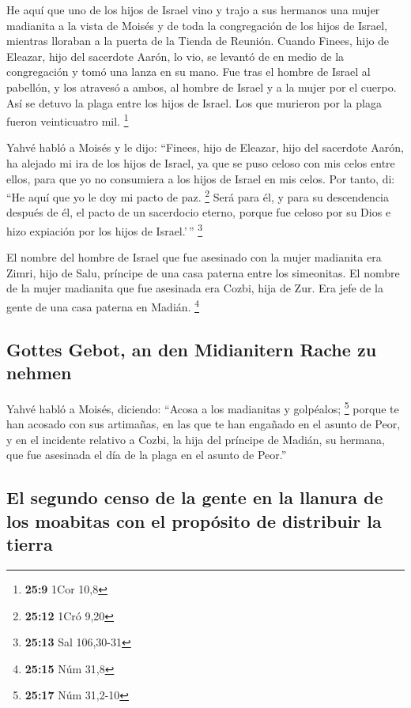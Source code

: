  He aquí que uno de los hijos de Israel vino y trajo a sus
hermanos una mujer madianita a la vista de Moisés y de toda la
congregación de los hijos de Israel, mientras lloraban a la puerta de la
Tienda de Reunión.  Cuando Finees, hijo de Eleazar, hijo
del sacerdote Aarón, lo vio, se levantó de en medio de la congregación y
tomó una lanza en su mano.  Fue tras el hombre de Israel
al pabellón, y los atravesó a ambos, al hombre de Israel y a la mujer
por el cuerpo. Así se detuvo la plaga entre los hijos de Israel.
 Los que murieron por la plaga fueron veinticuatro mil.
\footnote{\textbf{25:9} 1Cor 10,8}

 Yahvé habló a Moisés y le dijo: 
``Finees, hijo de Eleazar, hijo del sacerdote Aarón, ha alejado mi ira
de los hijos de Israel, ya que se puso celoso con mis celos entre ellos,
para que yo no consumiera a los hijos de Israel en mis celos.
 Por tanto, di: ``He aquí que yo le doy mi pacto de paz.
\footnote{\textbf{25:12} 1Cró 9,20}  Será para él, y para
su descendencia después de él, el pacto de un sacerdocio eterno, porque
fue celoso por su Dios e hizo expiación por los hijos de Israel.'\,''
\footnote{\textbf{25:13} Sal 106,30-31}

 El nombre del hombre de Israel que fue asesinado con la
mujer madianita era Zimri, hijo de Salu, príncipe de una casa paterna
entre los simeonitas.  El nombre de la mujer madianita
que fue asesinada era Cozbi, hija de Zur. Era jefe de la gente de una
casa paterna en Madián. \footnote{\textbf{25:15} Núm 31,8}

\hypertarget{gottes-gebot-an-den-midianitern-rache-zu-nehmen}{%
\subsection{Gottes Gebot, an den Midianitern Rache zu
nehmen}\label{gottes-gebot-an-den-midianitern-rache-zu-nehmen}}

 Yahvé habló a Moisés, diciendo:  ``Acosa
a los madianitas y golpéalos; \footnote{\textbf{25:17} Núm 31,2-10}
 porque te han acosado con sus artimañas, en las que te
han engañado en el asunto de Peor, y en el incidente relativo a Cozbi,
la hija del príncipe de Madián, su hermana, que fue asesinada el día de
la plaga en el asunto de Peor.''

\hypertarget{el-segundo-censo-de-la-gente-en-la-llanura-de-los-moabitas-con-el-propuxf3sito-de-distribuir-la-tierra}{%
\subsection{El segundo censo de la gente en la llanura de los moabitas
con el propósito de distribuir la
tierra}\label{el-segundo-censo-de-la-gente-en-la-llanura-de-los-moabitas-con-el-propuxf3sito-de-distribuir-la-tierra}}

